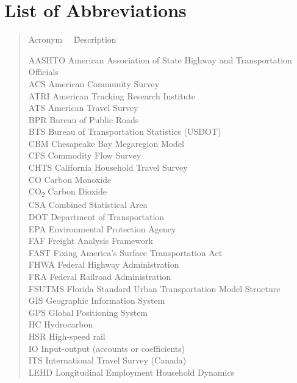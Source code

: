 \chapter*{List of Abbreviations}
\begin{quote}
\begin{tabbing}
Acronym~~ \= Description \kill

AASHTO \> American Association of State Highway and Transportation Officials \\
ACS \> American Community Survey \\
ATRI \> American Trucking Research Institute \\
ATS \> American Travel Survey \\
BPR \> Bureau of Public Roads \\
BTS \> Bureau of Transportation Statistics (USDOT) \\
CBM \> Chesapeake Bay Megaregion Model \\
CFS \> Commodity Flow Survey \\
CHTS \> California Household Travel Survey \\
CO \> Carbon Monoxide \\
CO\textsubscript{2} \> Carbon Dioxide \\
CSA \> Combined Statistical Area \\
DOT \> Department of Transportation \\
EPA \> Environmental Protection Agency \\
FAF \> Freight Analysis Framework \\
FAST \> Fixing America's Surface Transportation Act \\
FHWA \> Federal Highway Administration \\
FRA \> Federal Railroad Administration \\
FSUTMS \> Florida Standard Urban Transportation Model Structure \\
GIS \> Geographic Information System \\
GPS \> Global Positioning System \\
HC \> Hydrocarbon \\
HSR \> High-speed rail \\
IO \> Input-output (accounts or coefficients) \\
ITS \> International Travel Survey (Canada) \\
LEHD \> Longitudinal Employment Household Dynamics \\

\end{tabbing}
\end{quote}

